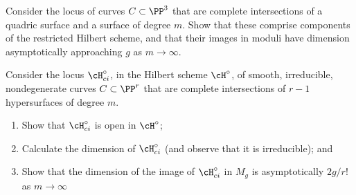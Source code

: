 \begin{exercise}\label{balanced CI}
Consider the locus of curves $C \subset \PP^3$ that are complete intersections of a quadric surface and a surface of degree $m$. Show that these comprise components of the restricted Hilbert scheme, and that their images in moduli have dimension asymptotically approaching $g$ as $m \to \infty$.
\end{exercise}

\begin{exercise}\label{balanced CI in higher codim}
Consider the locus $\cH^\circ_{ci}$, in the Hilbert scheme $\cH^\circ$, of smooth, irreducible, nondegenerate curves $C \subset \PP^r$ that are complete intersections of $r-1$ hypersurfaces of degree $m$. 
\begin{enumerate}
\item Show that $\cH^\circ_{ci}$ is open in $\cH^\circ$;
\item Calculate the dimension of $\cH^\circ_{ci}$ (and observe that it is irreducible); and
\item Show that the dimension of the image of $\cH^\circ_{ci}$ in $M_g$ is asymptotically $2g/r!$ as $m \to \infty$
\end{enumerate}
\end{exercise}





